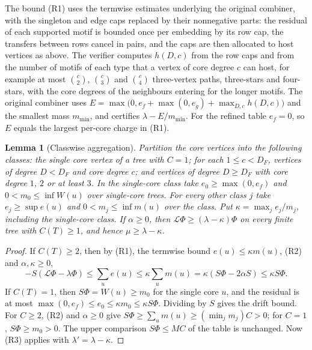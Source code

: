 \documentclass[11pt]{article}
\newtheorem{lemma}{Lemma}[section]
\theoremstyle{remark}
\numberwithin{equation}{section}
\begin{document}
The bound (R1) uses the termwise estimates underlying the original combiner, with the singleton and edge caps replaced by their nonnegative parts: the residual of each supported motif is bounded once per embedding by its row cap, the transfers between rows cancel in pairs, and the caps are then allocated to host vertices as above. The verifier computes $h(D,c)$ from the row caps and from the number of motifs of each type that a vertex of core degree $c$ can host, for example at most $\binom c2$, $\binom c3$ and $\binom c4$ three-vertex paths, three-stars and four-stars, with the core degrees of the neighbours entering for the longer motifs. The original combiner uses $E=\max\bigl(0,e_f+\max(0,e_g)+\max_{D,c}h(D,c)\bigr)$ and the smallest mass $m_{\min}$, and certifies $\lambda-E/m_{\min}$. For the refined table $e_f=0$, so $E$ equals the largest per-core charge in (R1).

\begin{lemma}[Classwise aggregation]\label{lem:classwise}
Partition the core vertices into the following classes: the single core vertex of a tree with $C=1$; for each $1\le c<D_F$, vertices of degree $D<D_F$ and core degree $c$; and vertices of degree $D\ge D_F$ with core degree $1$, $2$ or at least $3$. In the single-core class take $e_0\ge\max(0,e_f)$ and $0<m_0\le\inf W(u)$ over single-core trees. For every other class $j$ take $e_j\ge\sup e(u)$ and $0<m_j\le\inf m(u)$ over the class. Put $\kappa=\max_je_j/m_j$, including the single-core class. If $\alpha\ge0$, then $\mathcal L\Phi\ge(\lambda-\kappa)\Phi$ on every finite tree with $C(T)\ge1$, and hence $\mu\ge\lambda-\kappa$.
\end{lemma}
\begin{proof}
If $C(T)\ge2$, then by (R1), the termwise bound $e(u)\le\kappa m(u)$, (R2) and $\alpha,\kappa\ge0$,
\[
 -S(\mathcal L\Phi-\lambda\Phi)\le\sum_ue(u)\le\kappa\sum_um(u)=\kappa(S\Phi-2\alpha S)\le\kappa S\Phi .
\]
If $C(T)=1$, then $S\Phi=W(u)\ge m_0$ for the single core $u$, and the residual is at most $\max(0,e_f)\le e_0\le\kappa m_0\le\kappa S\Phi$. Dividing by $S$ gives the drift bound. For $C\ge2$, (R2) and $\alpha\ge0$ give $S\Phi\ge\sum_um(u)\ge(\min_jm_j)C>0$; for $C=1$, $S\Phi\ge m_0>0$. The upper comparison $S\Phi\le MC$ of the table is unchanged. Now (R3) applies with $\lambda'=\lambda-\kappa$.
\end{proof}
\end{document}

